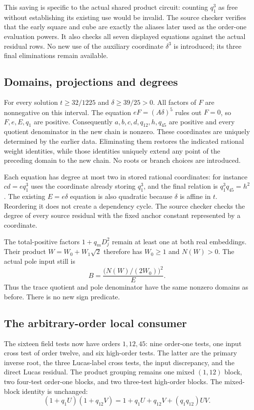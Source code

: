 This saving is specific to the actual shared product circuit: counting
$q_1^3$ as free without establishing its existing use would be invalid.
The source checker verifies that the early square and cube are exactly
the aliases later used as the order-one evaluation powers. It also checks
all seven displayed equations against the actual residual rows.
No new use of the auxiliary coordinate $\delta^3$ is introduced; its
three final eliminations remain available.

\subsection{Domains, projections and degrees}

For every solution $t\ge32/1225$ and $\delta\ge39/25>0$.
All factors of $F$ are nonnegative on this interval. The equation
$eF=(A\delta)^5$ rules out $F=0$, so $F,e,E,q_1$ are positive.
Consequently $a,b,c,d,q_{12},h,q_{45}$ are positive and every quotient
denominator in the new chain is nonzero. These coordinates are uniquely
determined by the earlier data. Eliminating them restores the indicated
rational weight identities, while those identities uniquely extend any
point of the preceding domain to the new chain. No roots or branch
choices are introduced.

Each equation has degree at most two in stored rational coordinates:
for instance $cd=e q_1^3$ uses the coordinate already storing $q_1^3$,
and the final relation is $q_1^3q_{45}=h^2$. The existing $E=e\delta$
equation is also quadratic because $\delta$ is affine in $t$.
Reordering it does not create a dependency cycle. The source checker
checks the degree of every source residual with the fixed anchor
constant represented by a coordinate.

The total-positive factors $1+q_mD_j^2$ remain at least one at both real
embeddings. Their product $W=W_0+W_1\sqrt2$ therefore has $W_0\ge1$
and $N(W)>0$. The actual pole input still is
\[
 B=\frac{\bigl(N(W)/(2W_0)\bigr)^2}{E}.
\]
Thus the trace quotient and pole denominator have the same nonzero
domains as before. There is no new sign predicate.

\subsection{The arbitrary-order local consumer}

The sixteen field tests now have orders $1,12,45$: nine order-one tests,
one input cross test of order twelve, and six high-order tests. The latter
are the primary inverse root, the three Lucas-label cross tests, the input
discrepancy, and the direct Lucas residual. The product grouping remains
one mixed $(1,12)$ block, two four-test order-one blocks, and two
three-test high-order blocks. The mixed-block identity is unchanged:
\[
 (1+q_1U)(1+q_{12}V)
 =1+q_1U+q_{12}V+(q_1q_{12})UV.
\]

